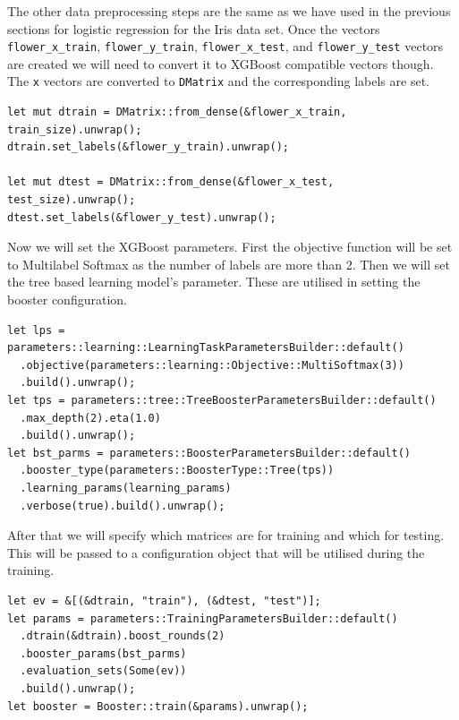 \documentclass{book}
\begin{document}
The other data preprocessing steps are the same as we have used in the previous sections for logistic regression for the Iris data set. Once the vectors \lstinline{flower_x_train}, \lstinline{flower_y_train}, \lstinline{flower_x_test}, and \lstinline{flower_y_test} vectors are created we will need to convert it to XGBoost compatible vectors though. The \lstinline{x} vectors are converted to \lstinline{DMatrix} and the corresponding labels are set.

\begin{lstlisting}[caption={chapter3\\/iris\_classification\_xgboost\\/src\\/main\\.rs}]
let mut dtrain = DMatrix::from_dense(&flower_x_train, train_size).unwrap();
dtrain.set_labels(&flower_y_train).unwrap();

let mut dtest = DMatrix::from_dense(&flower_x_test, test_size).unwrap();
dtest.set_labels(&flower_y_test).unwrap();
\end{lstlisting}

Now we will set the XGBoost parameters. First the objective function will be set to Multilabel Softmax as the number of labels are more than 2.  Then we will set the tree based learning model's parameter. These are utilised in setting the booster configuration.

\begin{lstlisting}[caption={chapter3\\/iris\_classification\_xgboost\\/src\\/main\\.rs}]
let lps = parameters::learning::LearningTaskParametersBuilder::default()
  .objective(parameters::learning::Objective::MultiSoftmax(3))
  .build().unwrap();
let tps = parameters::tree::TreeBoosterParametersBuilder::default()
  .max_depth(2).eta(1.0)
  .build().unwrap();
let bst_parms = parameters::BoosterParametersBuilder::default()
  .booster_type(parameters::BoosterType::Tree(tps))
  .learning_params(learning_params)
  .verbose(true).build().unwrap();
\end{lstlisting}

After that we will specify which matrices are for training and which for testing. This will be passed to a configuration object that will be utilised during the training.

\begin{lstlisting}[caption={chapter3\\/iris\_classification\_xgboost\\/src\\/main\\.rs}]
let ev = &[(&dtrain, "train"), (&dtest, "test")];
let params = parameters::TrainingParametersBuilder::default()
  .dtrain(&dtrain).boost_rounds(2)
  .booster_params(bst_parms)
  .evaluation_sets(Some(ev))
  .build().unwrap();
let booster = Booster::train(&params).unwrap();
\end{lstlisting}
\end{document}
